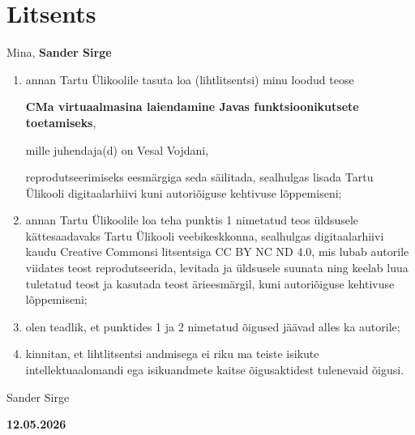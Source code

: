 ﻿\section*{Litsents}\label{litsents} 
Mina, \textbf{Sander Sirge}

\begin{enumerate}
\def\labelenumi{\arabic{enumi}.}
\item
    annan Tartu Ülikoolile tasuta loa (lihtlitsentsi) minu loodud teose

    \textbf{CMa virtuaalmasina laiendamine Javas funktsioonikutsete toetamiseks},

    mille juhendaja(d) on Vesal Vojdani,

    reprodutseerimiseks eesmärgiga seda säilitada, sealhulgas lisada Tartu
    Ülikooli digitaalarhiivi kuni autoriõiguse kehtivuse lõppemiseni;

\item
    annan Tartu Ülikoolile loa teha punktis 1 nimetatud teos üldsusele
    kättesaadavaks Tartu Ülikooli veebikeskkonna, sealhulgas
    digitaalarhiivi kaudu Creative Commonsi litsentsiga CC BY NC ND 4.0,
    mis lubab autorile viidates teost reprodutseerida, levitada ja
    üldsusele suunata ning keelab luua tuletatud teost ja kasutada teost
    ärieesmärgil, kuni autoriõiguse kehtivuse lõppemiseni;
\item
    olen teadlik, et punktides 1 ja 2 nimetatud õigused jäävad alles ka
    autorile;
\item
    kinnitan, et lihtlitsentsi andmisega ei riku ma teiste isikute
    intellektuaalomandi ega isikuandmete kaitse õigusaktidest tulenevaid
    õigusi.
\end{enumerate}

Sander Sirge

\textbf{12.05.2026}